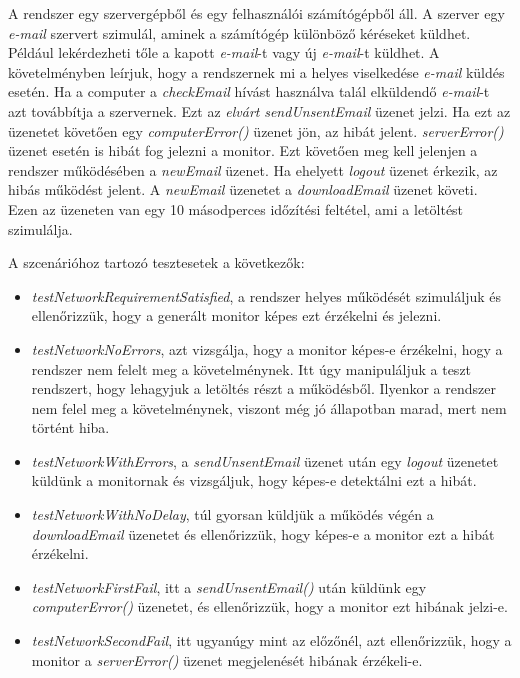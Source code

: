 A rendszer egy szervergépből és egy felhasználói számítógépből áll.
A szerver egy \textit{e-mail} szervert szimulál, aminek a számítógép különböző kéréseket küldhet.
Például lekérdezheti tőle a kapott \textit{e-mail}-t vagy új \textit{e-mail}-t küldhet.
A követelményben leírjuk, hogy a rendszernek mi a helyes viselkedése \textit{e-mail} küldés esetén.
Ha a computer a \textit{checkEmail} hívást használva talál elküldendő \textit{e-mail}-t azt továbbítja a szervernek.
Ezt az \textit{elvárt} \textit{sendUnsentEmail} üzenet jelzi.
Ha ezt az üzenetet követően egy \textit{computerError()} üzenet jön, az hibát jelent.
\textit{serverError()} üzenet esetén is hibát fog jelezni a monitor.
Ezt követően meg kell jelenjen a rendszer működésében a \textit{newEmail} üzenet.
Ha ehelyett \textit{logout} üzenet érkezik, az hibás működést jelent.
A \textit{newEmail} üzenetet a \textit{downloadEmail} üzenet követi.
Ezen az üzeneten van egy 10 másodperces időzítési feltétel, ami a letöltést szimulálja.

A szcenárióhoz tartozó tesztesetek a következők:
\begin{itemize}
    \item \textit{testNetworkRequirementSatisfied}, a rendszer helyes működését szimuláljuk és ellenőrizzük, hogy a generált monitor képes ezt érzékelni és jelezni.
    \item \textit{testNetworkNoErrors}, azt vizsgálja, hogy a monitor képes-e érzékelni, hogy a rendszer nem felelt meg a követelménynek.
    Itt úgy manipuláljuk a teszt rendszert, hogy lehagyjuk a letöltés részt a működésből.
    Ilyenkor a rendszer nem felel meg a követelménynek, viszont még jó állapotban marad, mert nem történt hiba.
    \item \textit{testNetworkWithErrors}, a \textit{sendUnsentEmail} üzenet után egy \textit{logout} üzenetet küldünk a monitornak és vizsgáljuk, hogy képes-e detektálni ezt a hibát.
    \item \textit{testNetworkWithNoDelay}, túl gyorsan küldjük a működés végén a \textit{downloadEmail} üzenetet és ellenőrizzük, hogy képes-e a monitor ezt a hibát érzékelni.
    \item \textit{testNetworkFirstFail}, itt a \textit{sendUnsentEmail()} után küldünk egy \textit{computerError()} üzenetet, és ellenőrizzük, hogy a monitor ezt hibának jelzi-e.
    \item \textit{testNetworkSecondFail}, itt ugyanúgy mint az előzőnél, azt ellenőrizzük, hogy a monitor a \textit{serverError()} üzenet megjelenését hibának érzékeli-e.
\end{itemize}

